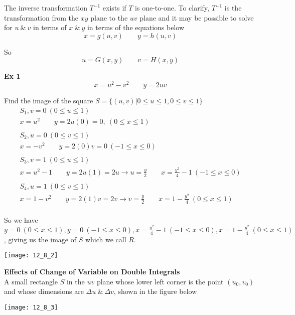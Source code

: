 \documentclass{article}
\begin{document}
  The inverse transformation $ T^{-1} $ exists if $ T $ is one-to-one. To clarify, $ T^{-1} $ is the transformation from the $ xy $ plane to the $ uv $ plane and it may be possible to solve for $ u ~\&~ v $ in terms of $ x ~\&~ y $ in terms of the equations below 
  \[
    x=g(u,v) \qquad y=h(u,v)
  \]

  So
  \[
    u=G(x,y) \qquad v=H(x,y)
  \]

  \textbf{Ex 1}
  \[
    x=u^{2}-v^{2} \qquad y=2uv
  \]

  Find the image of the square $ S=\{ (u,v) \bigg| 0 \le u \le 1, 0 \le v \le 1 \} $ 
  \[
    \begin{gathered}
    S_1, v=0~(0 \le u \le 1)\\
    x=u^{2} \qquad y=2u(0)=0,~(0 \le x \le 1)\\
    ~\\
    S_2, u=0~(0 \le v \le 1)\\
    x=-v^{2} \qquad y=2(0)v=0 ~ (-1 \le x \le  0)\\
    ~\\
    S_3, v=1~(0 \le u \le 1)\\
    x=u^{2}-1 \qquad y = 2u(1)=2u \to u= \frac{y}{2} \qquad x=\frac{y^{2}}{4}-1 ~ (-1 \le x \le 0)\\
    ~\\
    S_4, u=1 ~ (0 \le v \le 1)\\
    x=1-v^{2} \qquad y=2(1)v =2v \to v=\frac{y}{2} \qquad x=1-\frac{y^{2}}{4} ~ (0 \le x \le 1)\\
    \end{gathered}
  \]

  So we have $ y=0 ~(0 \le x \le 1), y=0~(-1 \le x \le 0), x=\frac{y^{2}}{4}-1~(-1 \le x \le 0),x=1-\frac{y^{2}}{4}~(0 \le x \le 1) $, giving us the image of $ S $ which we call $ R $.   

  \begin{center}
    \texttt{[image: 12\_8\_2]}
  \end{center} 

  \textbf{Effects of Change of Variable on Double Integrals}\\
  A small rectangle $ S $ in the $ uv $ plane whose lower left corner is the point $ (u_0,v_0) $ and whose dimensions are $ \Delta u ~\&~  \Delta v $, shown in the figure below

  \begin{center}
    \texttt{[image: 12\_8\_3]}
  \end{center}
\end{document}

